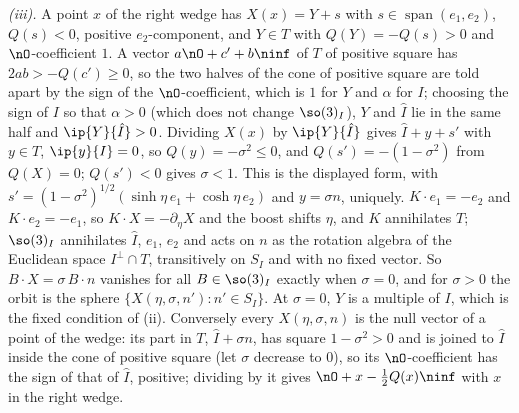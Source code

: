 \emph{(iii).} A point $x$ of the right wedge has $X(x) = Y + s$ with $s \in \operatorname{span}(e_{1}, e_{2})$, $Q(s) < 0$, positive $e_{2}$-component, and $Y \in T$ with $Q(Y) = -Q(s) > 0$ and $\nO$-coefficient $1$. A vector $a\nO + c' + b\ninf$ of $T$ of positive square has $2ab > -Q(c') \ge 0$, so the two halves of the cone of positive square are told apart by the sign of the $\nO$-coefficient, which is $1$ for $Y$ and $\alpha$ for $I$; choosing the sign of $I$ so that $\alpha > 0$ (which does not change $\so(3)_{I}$), $Y$ and $\hat I$ lie in the same half and $\ip{Y}{\hat I} > 0$. Dividing $X(x)$ by $\ip{Y}{\hat I}$ gives $\hat I + y + s'$ with $y \in T$, $\ip{y}{I} = 0$, so $Q(y) = -\sigma^{2} \le 0$, and $Q(s') = -(1 - \sigma^{2})$ from $Q(X) = 0$; $Q(s') < 0$ gives $\sigma < 1$. This is the displayed form, with $s' = (1 - \sigma^{2})^{1/2}(\sinh\eta\,e_{1} + \cosh\eta\,e_{2})$ and $y = \sigma n$, uniquely. $K \cdot e_{1} = -e_{2}$ and $K \cdot e_{2} = -e_{1}$, so $K \cdot X = -\partial_{\eta}X$ and the boost shifts $\eta$, and $K$ annihilates $T$; $\so(3)_{I}$ annihilates $\hat I$, $e_{1}$, $e_{2}$ and acts on $n$ as the rotation algebra of the Euclidean space $I^{\perp} \cap T$, transitively on $S_{I}$ and with no fixed vector. So $B \cdot X = \sigma\,B \cdot n$ vanishes for all $B \in \so(3)_{I}$ exactly when $\sigma = 0$, and for $\sigma > 0$ the orbit is the sphere $\{X(\eta, \sigma, n') : n' \in S_{I}\}$. At $\sigma = 0$, $Y$ is a multiple of $I$, which is the fixed condition of (ii). Conversely every $X(\eta, \sigma, n)$ is the null vector of a point of the wedge: its part in $T$, $\hat I + \sigma n$, has square $1 - \sigma^{2} > 0$ and is joined to $\hat I$ inside the cone of positive square (let $\sigma$ decrease to $0$), so its $\nO$-coefficient has the sign of that of $\hat I$, positive; dividing by it gives $\nO + x - \tfrac12 Q(x)\ninf$ with $x$ in the right wedge.

